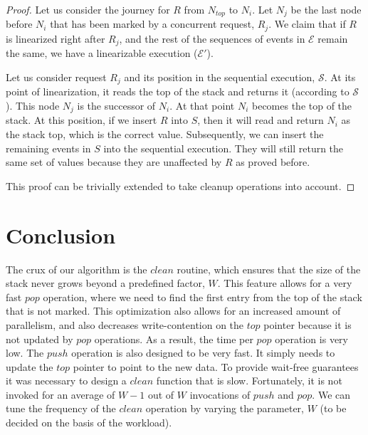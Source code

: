 \documentclass{llncs}
\begin{document}
\begin{proof}
Let us consider the journey for $R$ from $N_{top}$ to $N_i$. Let $N_j$ be the last node before $N_i$ that has been
marked by a concurrent request, $R_j$. We claim that if $R$ is linearized right after $R_j$, and the rest of the
sequences of events in $\mathcal{E}$ remain the same, we have a linearizable execution ($\mathcal{E'}$). 

Let us consider request $R_j$ and its position in the sequential execution, $\mathcal{S}$. At its point of
linearization, it reads the top of the stack and returns it (according to $\mathcal{S}$). This node $N_j$
is the successor of $N_i$. At that point $N_i$ becomes the top of the stack. At this position, if we insert
$R$ into $S$, then it will read and return $N_i$ as the stack top, which is the correct value. Subsequently,
we can insert the remaining events in $S$ into the sequential execution. They will still return the same set
of values because they are unaffected by $R$ as proved before. 

This proof can be trivially extended to take cleanup operations into account. 
\end{proof}







\section{Conclusion}
The crux of our algorithm is the $clean$ routine, which ensures that the size of the 
stack never grows beyond a predefined factor, $W$. This feature allows for
a very fast $pop$ operation, where we need to find the first entry from the top of the
stack that is not marked. This optimization also allows for an increased amount of parallelism, and
also decreases write-contention on the $top$ pointer because it is not updated by $pop$ operations. 
As a result, the time 
per $pop$ operation is very low. The $push$ operation is also designed to be very fast. It simply
needs to update the $top$ pointer to point to the new data. To provide wait-free guarantees
it was necessary to design a $clean$ function that is slow.
Fortunately, it is not invoked for an average of $W-1$ out of $W$ invocations of $push$ and $pop$. 
We can tune the frequency of the $clean$ operation by varying
the parameter, $W$ (to be decided on the basis of the workload). 
\end{document}
